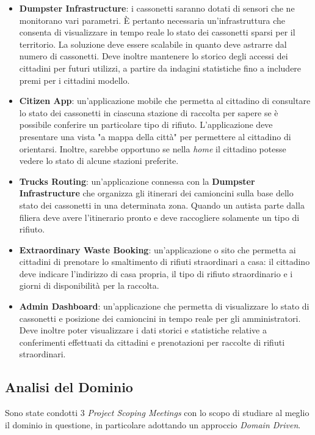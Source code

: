 \begin{itemize}
    \item \textbf{Dumpster Infrastructure}: i cassonetti saranno dotati di sensori che ne monitorano vari parametri.
    È pertanto necessaria un'infrastruttura che consenta di visualizzare in tempo reale lo stato dei cassonetti sparsi per il territorio.
    La soluzione deve essere scalabile in quanto deve astrarre dal numero di cassonetti.
    Deve inoltre mantenere lo storico degli accessi dei cittadini per futuri utilizzi, a partire da indagini statistiche fino a includere premi per i cittadini modello.
    \item \textbf{Citizen App}: un'applicazione mobile che permetta al cittadino di consultare lo stato dei cassonetti in ciascuna stazione di raccolta per sapere se è possibile conferire un particolare tipo di rifiuto.
    L'applicazione deve presentare una vista "a mappa della città" per permettere al cittadino di orientarsi.
    Inoltre, sarebbe opportuno se nella \textit{home} il cittadino potesse vedere lo stato di alcune stazioni preferite.
    \item \textbf{Trucks Routing}: un'applicazione connessa con la \textbf{Dumpster Infrastructure} che organizza gli itinerari dei camioncini sulla base dello stato dei cassonetti in una determinata zona.
    Quando un autista parte dalla filiera deve avere l'itinerario pronto e deve raccogliere solamente un tipo di rifiuto.
    \item \textbf{Extraordinary Waste Booking}: un'applicazione o sito che permetta ai cittadini di prenotare lo smaltimento di rifiuti straordinari a casa: il cittadino deve indicare l'indirizzo di casa propria, il tipo di rifiuto straordinario e i giorni di disponibilità per la raccolta.
    \item \textbf{Admin Dashboard}: un'applicazione che permetta di visualizzare lo stato di cassonetti e posizione dei camioncini in tempo reale per gli amministratori.
    Deve inoltre poter visualizzare i dati storici e statistiche relative a conferimenti effettuati da cittadini e prenotazioni per raccolte di rifiuti straordinari.
\end{itemize}

\subsection{Analisi del Dominio}
Sono state condotti 3 \textit{Project Scoping Meetings} con lo scopo di studiare al meglio il dominio in questione, in particolare adottando un approccio \textit{Domain Driven}.

